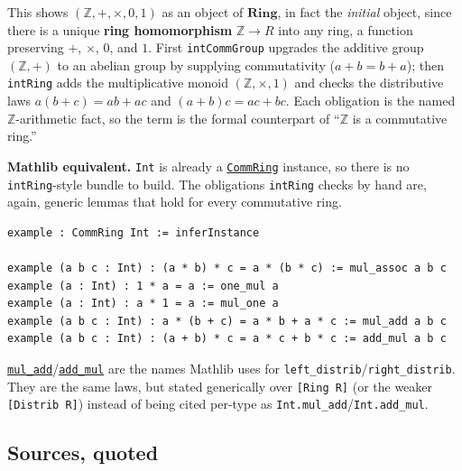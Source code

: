 \begin{mathreading}

This shows \((\mathbb{Z}, +, \times, 0, 1)\) as an object of \(\mathbf{Ring}\), in fact the \emph{initial} object, since there is a unique \textbf{ring homomorphism} \(\mathbb{Z} \to R\) into any ring, a function preserving \(+\), \(\times\), \(0\), and \(1\). First \texttt{intCommGroup} upgrades the additive group \((\mathbb{Z},+)\) to an abelian group by supplying commutativity (\(a + b = b + a\)); then \texttt{intRing} adds the multiplicative monoid \((\mathbb{Z}, \times, 1)\) and checks the distributive laws \(a(b+c) = ab + ac\) and \((a+b)c = ac + bc\). Each obligation is the named \(\mathbb{Z}\)-arithmetic fact, so the term is the formal counterpart of ``\(\mathbb{Z}\) is a commutative ring.''

\end{mathreading}

\textbf{Mathlib equivalent.} \texttt{Int} is already a \href{https://loogle.lean-lang.org/?q=CommRing}{\texttt{CommRing}} instance, so there is no \texttt{intRing}-style bundle to build. The obligations \texttt{intRing} checks by hand are, again, generic lemmas that hold for every commutative ring.

\begin{lstlisting}
example : CommRing Int := inferInstance

example (a b c : Int) : (a * b) * c = a * (b * c) := mul_assoc a b c
example (a : Int) : 1 * a = a := one_mul a
example (a : Int) : a * 1 = a := mul_one a
example (a b c : Int) : a * (b + c) = a * b + a * c := mul_add a b c
example (a b c : Int) : (a + b) * c = a * c + b * c := add_mul a b c
\end{lstlisting}

\href{https://loogle.lean-lang.org/?q=mul_add}{\texttt{mul\_\allowbreak{}add}}/\href{https://loogle.lean-lang.org/?q=add_mul}{\texttt{add\_\allowbreak{}mul}} are the names Mathlib uses for \texttt{left\_\allowbreak{}distrib}/\texttt{right\_\allowbreak{}distrib}. They are the same laws, but stated generically over \texttt{[Ring R]} (or the weaker \texttt{[Distrib R]}) instead of being cited per-type as \texttt{Int.mul\_\allowbreak{}add}/\texttt{Int.add\_\allowbreak{}mul}.

\subsection{Sources, quoted}\label{sec:08-rings:04-integers-example:2}


